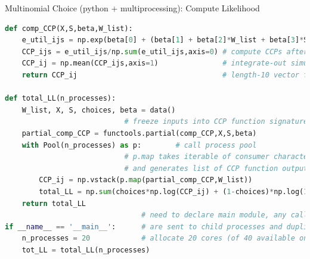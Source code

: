 \documentclass[aspectratio=1610,handout]{beamer}
\begin{document}
\begin{frame}[fragile]{Multinomial Choice (python + multiprocessing): Compute Likelihood}
    \begin{lstlisting}[language=Python]
def comp_CCP(X,S,beta,W_list):
    e_util_ijs = np.exp(beta[0] + (beta[1] + beta[2]*W_list + beta[3]*S)*X)
    CCP_ijs = e_util_ijs/np.sum(e_util_ijs,axis=0) # compute CCPs after broadcast
    CCP_ij = np.mean(CCP_ijs,axis=1)               # integrate-out simulants
    return CCP_ij                                  # length-10 vector for i

def total_LL(n_processes):
    W_list, X, S, choices, beta = data()
                            # freeze inputs into CCP function signature
    partial_comp_CCP = functools.partial(comp_CCP,X,S,beta)
    with Pool(n_processes) as p:        # call process pool
                            # p.map takes iterable of consumer characteristics
                            # and generates list of CCP function outputs
        CCP_ij = np.vstack(p.map(partial_comp_CCP,W_list))
        total_LL = np.sum(choices*np.log(CCP_ij) + (1-choices)*np.log(1-CCP_ij))
    return total_LL
                                # need to declare main module, any calls above
if __name__ == '__main__':      # are sent to child processes and duplicated
    n_processes = 20            # allocate 20 cores (of 40 available on VM)
    tot_LL = total_LL(n_processes)
    \end{lstlisting}
\end{frame}
\end{document}
